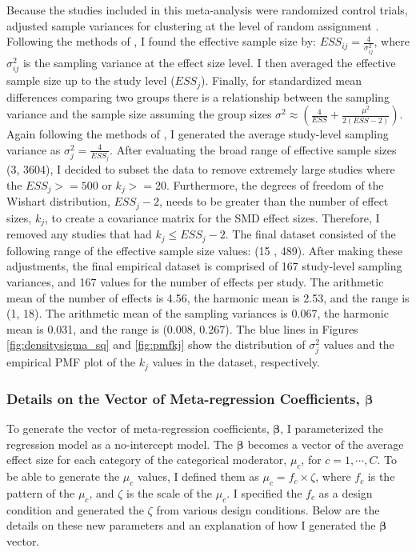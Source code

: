 Because the studies included in this meta-analysis were randomized control trials, \textcite{WilliamsRyan2022HiMI} adjusted sample variances for clustering at the level of random assignment \autocite{hedgesEffectSizesClusterRandomized2007, hedges2013}. Following the methods of \textcite{vembye2023}, I found the effective sample size by: $ESS_{ij} = \frac{4}{ \sigma_{ij}^2 }$, where $\sigma_{ij}^2 $ is the sampling variance at the effect size level.  I then averaged the effective sample size up to the study level ($ESS_j$). Finally, for standardized mean differences comparing two groups there is a relationship between the sampling variance and the sample size assuming the group sizes $\sigma^2 \approx \left( \frac{4}{ESS} + \frac{\mu^2}{2(ESS -2)} \right)$\autocite{valentine2010}. Again following the methods of \textcite{vembye2023}, I generated the average study-level sampling variance as $\sigma_j^2 = \frac{4}{ESS_j}$. After evaluating the broad range of effective sample sizes (3, 3604), I decided to subset the data to remove extremely large studies where the $ESS_j >= 500$ or $k_j >= 20$. Furthermore, the degrees of freedom of the Wishart distribution, $ESS_j-2$, needs to be greater than the number of effect sizes, $k_j$, to create a covariance matrix for the SMD effect sizes. Therefore, I removed any studies that had $k_j \leq ESS_j - 2$. The final dataset consisted of the following range of the effective sample size values: (15 , 489). After making these adjustments, the final empirical dataset is comprised of 167 study-level sampling variances, and  167 values for the number of effects per study. The arithmetic mean of the number of effects is 4.56, the harmonic mean is 2.53, and the range is (1, 18). The arithmetic mean of the sampling variances is 0.067, the harmonic mean is 0.031, and the range is (0.008, 0.267). The blue lines in Figures \ref{fig:densitysigma_sq} and \ref{fig:pmfkj} show the distribution of $\sigma_j^2$ values and the empirical PMF plot of the $k_j$ values in the dataset, respectively. 

\subsubsection{Details on the Vector of Meta-regression Coefficients, $\bm{\beta}$}

To generate the vector of meta-regression coefficients, $\bm{\beta}$, I parameterized the regression model as a no-intercept model. The $\bm{\beta}$ becomes a vector of the average effect size for each category of the categorical moderator, $\mu_c$, for $c = 1, \cdots, C$. To be able to generate the $\mu_c$ values, I defined them as $\mu_c = f_c \times \zeta$,  where $f_c$ is the pattern of the $\mu_c$, and $\zeta$ is the scale of the $\mu_c$. I specified the $f_c$ as a design condition and generated the $\zeta$ from various design conditions. Below are the details on these new parameters and an explanation of how I generated the $\bm{\beta}$ vector.

